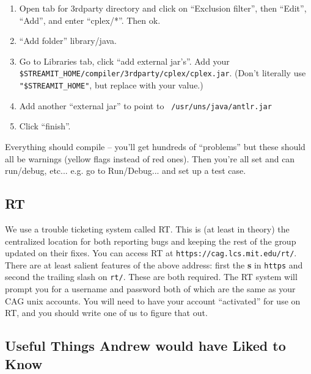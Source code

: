 \begin{enumerate}
\item Open tab for 3rdparty directory and click on ``Exclusion
filter'', then ``Edit'', ``Add'', and enter ``cplex/*''.  Then ok.

\item ``Add folder'' library/java.
  
\item Go to Libraries tab, click ``add external jar's''.  Add your
  {\tt \$STREAMIT\_HOME/compiler/3rdparty\slash{}cplex/cplex.jar}.
  (Don't literally use {\tt "\$STREAMIT\_HOME"}, but replace with your
  value.)

\item Add another ``external jar'' to point to {\tt
/usr/uns/java/antlr.jar}

\item Click ``finish''.
\end{enumerate}

Everything should compile -- you'll get hundreds of ``problems'' but
these should all be warnings (yellow flags instead of red ones).  Then
you're all set and can run/debug, etc... e.g. go to Run/Debug... and
set up a test case.


\subsection{RT}
We use a trouble ticketing system called RT. This is (at least
in theory) the centralized location for both reporting bugs and 
keeping the rest of the group updated on their fixes.
You can access RT at {\tt https://cag.lcs.mit.edu/rt/}. There are at least
salient features of the above address: first the {\bf s} in {\tt https}
and second the trailing slash on {\tt rt/}. These are both
required. The RT system will prompt you for a username and password
both of which are the same as your CAG unix accounts. 
You will need to have your account ``activated'' for use on 
RT, and you should write one of us to figure that out.

\subsection{Useful Things Andrew would have Liked to Know}

